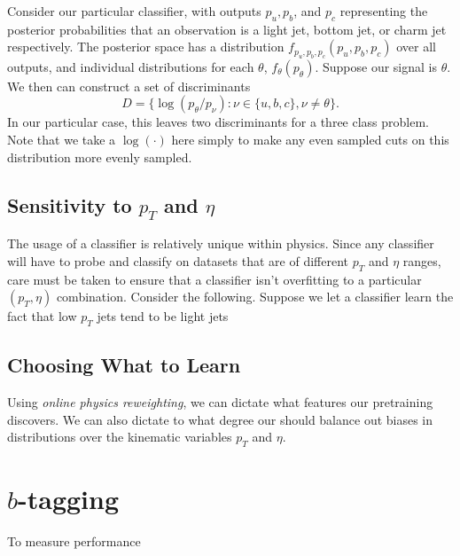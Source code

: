 Consider our particular classifier, with outputs $p_u, p_b$, and $p_c$ representing the posterior probabilities that an observation is a light jet, bottom jet, or charm jet respectively. The posterior space has a distribution $f_{p_u,p_b,p_c}(p_u, p_b, p_c)$ over all outputs, and individual distributions for each $\theta$, $f_\theta(p_\theta)$. Suppose our signal is $\theta$. We then can construct a set of discriminants
\begin{equation}
D = \{ \log(p_\theta / p_\nu) : \nu \in \{u,b,c\}, \nu \neq \theta \}.
\end{equation} 
In our particular case, this leaves two discriminants for a three class problem. Note that we take a $\log(\cdot)$ here simply to make any even sampled cuts on this distribution more evenly sampled. 

\subsection{Sensitivity to $p_T$ and $\eta$}

The usage of a classifier is relatively unique within physics. Since any classifier will have to probe and classify on datasets that are of different $p_T$ and $\eta$ ranges, care must be taken to ensure that a classifier isn't overfitting to a particular $(p_T,\eta)$ combination. Consider the following. Suppose we let a classifier learn the fact that low $p_T$ jets tend to be light jets

\subsection{Choosing What to Learn}

Using \emph{online physics reweighting}, we can dictate what features our pretraining discovers. We can also dictate to what degree our \nn{} should balance out biases in distributions over the kinematic variables $p_T$ and $\eta$.

\section{$b$-tagging}

To measure performance

